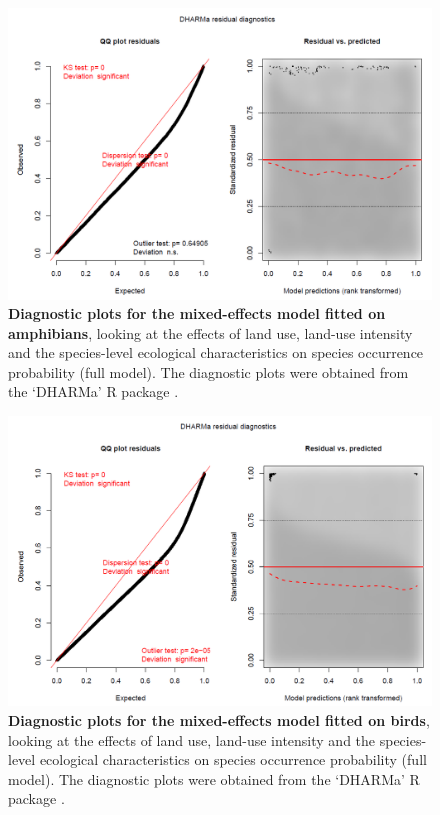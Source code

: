 \begin{figure}[h!]
\centering
\includegraphics[scale=0.45]{Supporting/Chapter4/Figures/LU_Diag_amphibians.png}
\caption[Land-use responses: diagnostic plots for the mixed-effects model fitted on amphibians]{\textbf{Diagnostic plots for the mixed-effects model fitted on amphibians}, looking at the effects of land use, land-use intensity and the species-level ecological characteristics on species occurrence probability (full model). The diagnostic plots were obtained from the `DHARMa' R package \citep{DHARMa}.}
\label{SI_4_Figure12}
\end{figure}

\begin{figure}[h!]
\centering
\includegraphics[scale=0.45]{Supporting/Chapter4/Figures/LU_Diag_birds.png}
\caption[Land-use responses: diagnostic plots for the mixed-effects model fitted on birds]{\textbf{Diagnostic plots for the mixed-effects model fitted on birds}, looking at the effects of land use, land-use intensity and the species-level ecological characteristics on species occurrence probability (full model). The diagnostic plots were obtained from the `DHARMa' R package \citep{DHARMa}.}
\label{SI_4_Figure13}
\end{figure}

